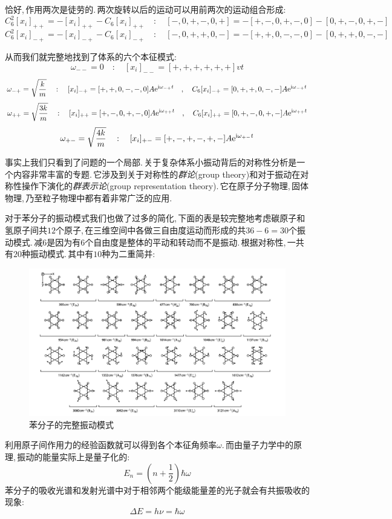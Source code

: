 恰好,\,作用两次是徒劳的.\,两次旋转以后的运动可以用前两次的运动组合形成:
\[C_6^2[x_i]_{++}=-[x_i]_{++}-C_6[x_i]_{++}\quad:\quad [-,0,+,-,0,+]=-[+,-,0,+,-,0]-[0,+,-,0,+,-]\]
\[C_6^2[x_i]_{-+}=-[x_i]_{-+}-C_6[x_i]_{-+}\quad:\quad [-,0,+,+,0,-]=-[+,+,0,-,-,0]-[0,+,+,0,-,-]\]

从而我们就完整地找到了体系的六个本征模式:
\[\omega_{--}=0\quad:\quad [x_i]_{--}=[+,+,+,+,+,+]vt\]
\[\omega_{-+}=\sqrt{\frac{k}{m}}\quad:\quad [x_i]_{-+}=[+,+,0,-,-,0]A{\rm e}^{{\rm i}\omega_{-+} t}\quad,\quad C_6[x_i]_{-+}=[0,+,+,0,-,-]A{\rm e}^{{\rm i}\omega_{-+} t}\]
\[\omega_{++}=\sqrt{\frac{3k}{m}}\quad:\quad [x_i]_{++}=[+,-,0,+,-,0]A{\rm e}^{{\rm i}\omega_{++} t}\quad,\quad C_6[x_i]_{++}=[0,+,-,0,+,-]A{\rm e}^{{\rm i}\omega_{++} t}\]
\[\omega_{+-}=\sqrt{\frac{4k}{m}}\quad:\quad [x_i]_{+-}=[+,-,+,-,+,-]A{\rm e}^{{\rm i}\omega_{+-} t}\]

事实上我们只看到了问题的一个局部.\,关于复杂体系小振动背后的对称性分析是一个内容非常丰富的专题.\,它涉及到关于对称性的\emph{群论}(group theory)和对于振动在对称性操作下演化的\emph{群表示论}(group representation theory).\,它在原子分子物理,\,固体物理,\,乃至粒子物理中都有着非常广泛的应用.

对于苯分子的振动模式我们也做了过多的简化,\,下面的表是较完整地考虑碳原子和氢原子间共$12$个原子,\,在三维空间中各做三自由度运动而形成的共$36-6=30$个振动模式.\,减$6$是因为有$6$个自由度是整体的平动和转动而不是振动.\,根据对称性,\,一共有$20$种振动模式.\,其中有$10$种为二重简并:
\begin{figure}[H]
\centering
\includegraphics[width=17cm]{image/6-3-9.png}
\caption{苯分子的完整振动模式}
\end{figure}

利用原子间作用力的经验函数就可以得到各个本征角频率$\omega$.\,而由量子力学中的原理,\,振动的能量实际上是量子化的:
\[E_n=\left(n+\frac{1}{2}\right)\hbar\omega\]
苯分子的吸收光谱和发射光谱中对于相邻两个能级能量差的光子就会有共振吸收的现象:
\[\Delta E=h\nu =\hbar \omega\]

